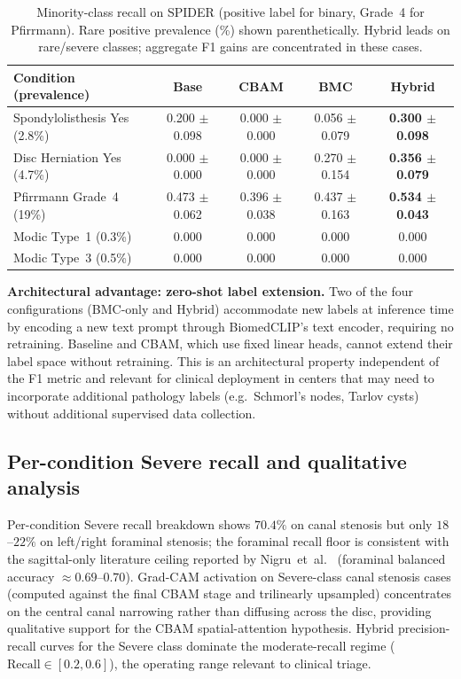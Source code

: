 \documentclass[runningheads]{llncs}
\newcommand{\best}[1]{\textcolor{best}{\textbf{#1}}}
\begin{document}
\begin{table}[t]
\centering
\caption{Minority-class recall on SPIDER (positive label for binary,
Grade~4 for Pfirrmann). Rare positive prevalence (\%) shown
parenthetically. Hybrid leads on rare/severe classes; aggregate F1
gains are concentrated in these cases.}
\label{tab:spider_minority}
\renewcommand{\arraystretch}{1.05}
\footnotesize
\begin{tabular}{@{}lcccc@{}}
\toprule
Condition (prevalence)              & Base   & CBAM   & BMC    & Hybrid \\
\midrule
Spondylolisthesis Yes (2.8\%)       & 0.200 $\pm$ 0.098 & 0.000 $\pm$ 0.000 & 0.056 $\pm$ 0.079 & \best{0.300 $\pm$ 0.098} \\
Disc Herniation Yes (4.7\%)         & 0.000 $\pm$ 0.000 & 0.000 $\pm$ 0.000 & 0.270 $\pm$ 0.154 & \best{0.356 $\pm$ 0.079} \\
Pfirrmann Grade~4 (19\%)            & 0.473 $\pm$ 0.062 & 0.396 $\pm$ 0.038 & 0.437 $\pm$ 0.163 & \best{0.534 $\pm$ 0.043} \\
Modic Type~1 (0.3\%)                & 0.000  & 0.000  & 0.000  & 0.000 \\
Modic Type~3 (0.5\%)                & 0.000  & 0.000  & 0.000  & 0.000 \\
\bottomrule
\end{tabular}
\end{table}

\textbf{Architectural advantage: zero-shot label extension.} Two of
the four configurations (BMC-only and Hybrid) accommodate new labels
at inference time by encoding a new text prompt through BiomedCLIP's
text encoder, requiring no retraining. Baseline and CBAM, which use
fixed linear heads, cannot extend their label space without retraining.
This is an architectural property independent of the F1 metric and
relevant for clinical deployment in centers that may need to
incorporate additional pathology labels (e.g.\ Schmorl's nodes,
Tarlov cysts) without additional supervised data collection.

\subsection{Per-condition Severe recall and qualitative analysis}

Per-condition Severe recall breakdown shows $70.4\%$ on canal
stenosis but only $18$--$22\%$ on left/right foraminal stenosis;
the foraminal recall floor is consistent with the sagittal-only
literature ceiling reported by Nigru~et~al.~\cite{nigru2024}
(foraminal balanced accuracy $\approx 0.69$--$0.70$). Grad-CAM
activation on Severe-class canal stenosis cases (computed against
the final CBAM stage and trilinearly upsampled) concentrates on the
central canal narrowing rather than diffusing across the disc,
providing qualitative support for the CBAM spatial-attention
hypothesis. Hybrid precision-recall curves for the Severe class
dominate the moderate-recall regime ($\mathrm{Recall} \in [0.2,
0.6]$), the operating range relevant to clinical triage.
\end{document}
